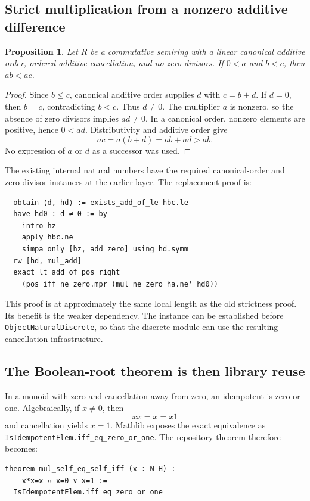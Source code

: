 \documentclass[11pt,letterpaper]{article}
\newcommand{\code}[1]{\nolinkurl{#1}}
\newtheorem{proposition}{Proposition}
\begin{document}
\subsection{Strict multiplication from a nonzero additive difference}
\begin{proposition}
Let \(R\) be a commutative semiring with a linear canonical additive order, ordered additive cancellation, and no zero divisors. If \(0<a\) and \(b<c\), then \(ab<ac\).
\end{proposition}
\begin{proof}
Since \(b\leq c\), canonical additive order supplies \(d\) with \(c=b+d\). If \(d=0\), then \(b=c\), contradicting \(b<c\). Thus \(d\ne0\). The multiplier \(a\) is nonzero, so the absence of zero divisors implies \(ad\ne0\). In a canonical order, nonzero elements are positive, hence \(0<ad\). Distributivity and additive order give
\[
 ac=a(b+d)=ab+ad>ab.
\]
No expression of \(a\) or \(d\) as a successor was used.
\end{proof}

The existing internal natural numbers have the required canonical-order and zero-divisor instances at the earlier layer. The replacement proof is:
\begin{lstlisting}
  obtain ⟨d, hd⟩ := exists_add_of_le hbc.le
  have hd0 : d ≠ 0 := by
    intro hz
    apply hbc.ne
    simpa only [hz, add_zero] using hd.symm
  rw [hd, mul_add]
  exact lt_add_of_pos_right _
    (pos_iff_ne_zero.mpr (mul_ne_zero ha.ne' hd0))
\end{lstlisting}

This proof is at approximately the same local length as the old strictness proof. Its benefit is the weaker dependency. The instance can be established before \code{ObjectNaturalDiscrete}, so that the discrete module can use the resulting cancellation infrastructure.

\subsection{The Boolean-root theorem is then library reuse}
In a monoid with zero and cancellation away from zero, an idempotent is zero or one. Algebraically, if \(x\ne0\), then
\[
 xx=x=x1
\]
and cancellation yields \(x=1\). Mathlib exposes the exact equivalence as \code{IsIdempotentElem.iff_eq_zero_or_one}. The repository theorem therefore becomes:
\begin{lstlisting}
theorem mul_self_eq_self_iff (x : N H) :
    x*x=x ↔ x=0 ∨ x=1 :=
  IsIdempotentElem.iff_eq_zero_or_one
\end{lstlisting}
\end{document}
